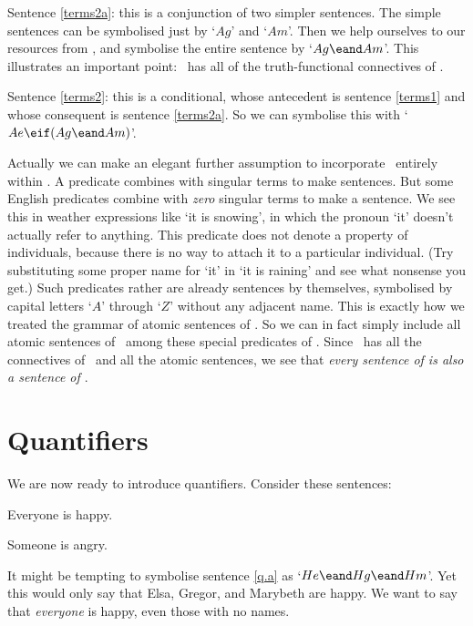 Sentence \ref{terms2a}: this is a conjunction of two simpler sentences. The simple sentences can be symbolised just by `$Ag$' and `$Am$'. Then we help ourselves to our resources from \TFL, and symbolise the entire sentence by `$Ag \eand Am$'. This illustrates an important point: \FOL\ has all of the truth-functional connectives of \TFL.

Sentence \ref{terms2}: this is a conditional, whose antecedent is sentence \ref{terms1} and whose consequent is sentence \ref{terms2a}. So we can symbolise this with `$Ae \eif (Ag \eand Am)$'.

Actually we can make an elegant further assumption to incorporate \TFL\ entirely within \FOL. A predicate combines with singular terms to make sentences. But some English predicates combine with \emph{zero} singular terms to make a sentence. We see this in weather expressions like `it is snowing', in which the pronoun `it' doesn't actually refer to anything. This predicate does not denote a property of individuals, because there is no way to attach it to a particular individual. (Try substituting some proper name for `it' in `it is raining' and see what nonsense you get.) Such predicates rather are already sentences by themselves, symbolised by capital letters `$A$' through `$Z$' without any adjacent name. This is exactly how we treated the grammar of atomic sentences of \TFL. So we can in fact simply include all atomic sentences of \TFL\ among these special predicates of \FOL. Since \FOL\ has all the connectives of \TFL\ and all the atomic sentences, we see that \emph{every sentence of \textnormal{\TFL} is also a sentence of \textnormal{\FOL}}.


\section{Quantifiers}\label{quant.pron}
We are now ready to introduce quantifiers. Consider these sentences:
	\begin{earg}
		\item[\ex{q.a}] Everyone is happy.
		\item[\ex{q.e}] Someone is angry.
	\end{earg}
It might be tempting to symbolise sentence \ref{q.a} as `$He \eand Hg \eand Hm$'. Yet this would only say that Elsa, Gregor, and Marybeth are happy. We want to say that \emph{everyone} is happy, even those with no names. %

